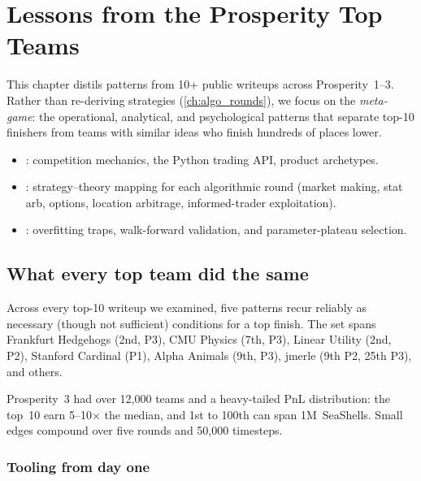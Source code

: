 \chapter{Lessons from the Prosperity Top Teams}
\label{ch:top_team_lessons}

This chapter distils patterns from 10+ public writeups across
Prosperity~1--3.  Rather than re-deriving strategies
(\cref{ch:algo_rounds}), we focus on the \emph{meta-game}: the
operational, analytical, and psychological patterns that separate
top-10 finishers from teams with similar ideas who finish hundreds
of places lower.

\begin{backgroundbox}[Prerequisites]
\begin{itemize}
  \item {}: competition mechanics, the
        Python trading API, product archetypes.
  \item {}: strategy--theory mapping for each
        algorithmic round (market making, stat arb, options, location
        arbitrage, informed-trader exploitation).
  \item {}: overfitting traps, walk-forward
        validation, and parameter-plateau selection.
\end{itemize}
\end{backgroundbox}

\section{What every top team did the same}
\label{sec:top_same}

Across every top-10 writeup we examined, five patterns recur
reliably as necessary (though not sufficient) conditions for a top
finish.  The set spans Frankfurt Hedgehogs (2nd, P3), CMU Physics
(7th, P3), Linear Utility (2nd, P2), Stanford Cardinal (P1), Alpha
Animals (9th, P3), jmerle (9th P2, 25th P3), and others.

Prosperity~3 had over 12,000 teams and a heavy-tailed PnL
distribution: the top~10 earn 5--10$\times$ the median, and 1st
to 100th can span 1M~SeaShells.  Small edges compound over five
rounds and 50{,}000 timesteps.

\subsection{Tooling from day one}
\label{sec:tooling_day1}

